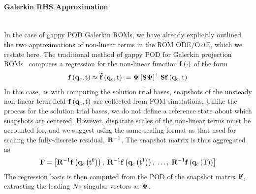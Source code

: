 \paragraph*{Galerkin RHS Approximation}\mbox{}\\
%
In the case of gappy POD Galerkin ROMs, we have already explicitly outlined the two approximations of non-linear terms in the ROM ODE/O$\Delta$E, which we restate here. The traditional method of gappy POD for Galerkin projection ROMs~\cite{Chaturantabut2010} computes a regression for the non-linear function $\mathbf{f} \left(\cdot\right)$ of the form
%
\begin{equation}
	\rhsFunc{\consVec, \timeVar} \approx \rhsApproxFunc{\consVec, \timeVar} \defEq \deimBasis \left[\sampMat \deimBasis \right]^+ \sampMat \rhsFunc{\consVec, \timeVar}
\end{equation}
%
In this case, as with computing the solution trial bases, snapshots of the unsteady non-linear term field $\mathbf{f} \left(\mathbf{q}_{c}, \text{t}\right)$ are collected from FOM simulations. Unlike the process for the solution trial bases, we do not define a reference state about which snapshots are centered. However, disparate scales of the non-linear terms must be accounted for, and we suggest using the same scaling format as that used for scaling the fully-discrete residual, $\resScaleInv$. The snapshot matrix is thus aggregated as
%
\begin{equation}
	\rhsDataMat = \left[ \resScaleInv \rhsFunc{\consFunc{\timeVar^0}}, \; \resScaleInv \rhsFunc{\consFunc{\timeVar^1}}, \; \hdots, \; \resScaleInv \rhsFunc{\consFunc{\finalTime}} \right]
\end{equation}
%
The regression basis is then computed from the POD of the snapshot matrix $\rhsDataMat$, extracting the leading $N_r$ singular vectors as $\deimBasis$.

